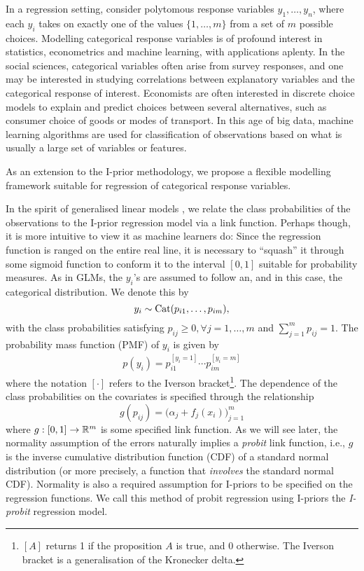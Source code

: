 \documentclass[a4paper,showframe,11pt]{report}
\begin{document}

In a regression setting, consider polytomous response variables $y_1,\dots,y_n$, where each $y_i$ takes on exactly one of the values $\{1,\dots,m\}$ from a set of $m$ possible choices.
Modelling categorical response variables is of profound interest in statistics, econometrics and machine learning, with applications aplenty. 
In the social sciences, categorical variables often arise from survey responses, and one may be interested in studying correlations between  explanatory variables and the categorical response of interest.
Economists are often interested in discrete choice models to explain and predict choices between several alternatives, such as consumer choice of goods or modes of transport.
In this age of big data, machine learning algorithms are used for classification of observations based on what is usually a large set of variables or features.

As an extension to the I-prior methodology, we propose a flexible modelling framework suitable for regression of categorical response variables.

In the spirit of generalised linear models \citep{mccullagh1989}, we relate the class probabilities of the observations to the I-prior regression model via a link function.
Perhaps though, it is more intuitive to view it as machine learners do: Since the regression function is ranged on the entire real line, it is necessary to ``squash'' it through some sigmoid function to conform it to the interval $[0,1]$ suitable for probability measures.
As in GLMs, the $y_i$'s are assumed to follow an, and in this case, the categorical distribution.
We denote this by
\[
  y_i \sim \operatorname{Cat}(p_{i1},\dots,p_{im}),
\]
with the class probabilities satisfying $p_{ij} \geq 0, \forall j=1,\dots,m$ and $\sum_{j=1}^m p_{ij} = 1$. 
The probability mass function (PMF) of $y_i$ is given by
\begin{align}\label{eq:catdist}
  p(y_i) = p_{i1}^{[y_i = 1]} \cdots p_{im}^{[y_i = m]}
\end{align}
where the notation $[\cdot]$ refers to the Iverson bracket\footnote{$[A]$ returns 1 if the proposition $A$ is true, and 0 otherwise. The Iverson bracket is a generalisation of the Kronecker delta.}. 
The dependence of the class probabilities on the covariates is specified through the relationship
\[
  g(p_{ij}) = \big(\alpha_j + f_j(x_i)\big)_{j=1}^m
\]
where $g:[0,1]\to\mathbb{R}^m$ is some specified link function.
As we will see later, the normality assumption of the errors naturally implies a \emph{probit} link function, i.e., $g$ is the inverse cumulative distribution function (CDF) of a standard normal distribution (or more precisely, a function that \emph{involves} the standard normal CDF).
Normality is also a required assumption for I-priors to be specified on the regression functions.
We call this method of probit regression using I-priors the \emph{I-probit} regression model.
\end{document}
